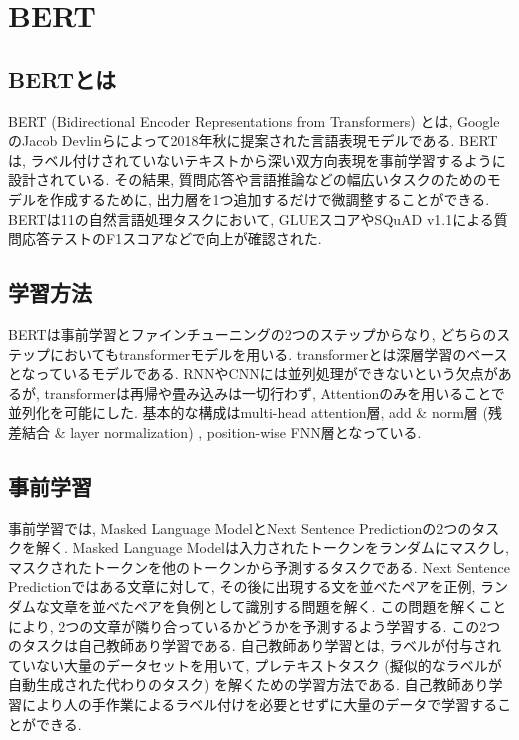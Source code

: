 
\section{BERT}
\subsection{BERTとは}\label{aboutbert}
BERT (Bidirectional Encoder Representations from Transformers) \cite{bert}とは, GoogleのJacob Devlinらによって2018年秋に提案された言語表現モデルである. BERTは, ラベル付けされていないテキストから深い双方向表現を事前学習するように設計されている. その結果, 質問応答や言語推論などの幅広いタスクのためのモデルを作成するために, 出力層を1つ追加するだけで微調整することができる. 
BERTは11の自然言語処理タスクにおいて, GLUEスコアやSQuAD v1.1による質問応答テストのF1スコアなどで向上が確認された. \cite{bert}

\subsection{学習方法}
BERTは事前学習とファインチューニングの2つのステップからなり, どちらのステップにおいてもtransformerモデルを用いる. transformerとは深層学習のベースとなっているモデルである. RNNやCNNには並列処理ができないという欠点があるが, transformerは再帰や畳み込みは一切行わず, Attentionのみを用いることで並列化を可能にした. 基本的な構成はmulti-head attention層, add \& norm層 (残差結合 \& layer normalization) , position-wise FNN層となっている. 

\subsection{事前学習}
事前学習では, Masked Language ModelとNext Sentence Predictionの2つのタスクを解く. Masked Language Modelは入力されたトークンをランダムにマスクし, マスクされたトークンを他のトークンから予測するタスクである. Next Sentence Predictionではある文章に対して, その後に出現する文を並べたペアを正例, ランダムな文章を並べたペアを負例として識別する問題を解く. この問題を解くことにより, 2つの文章が隣り合っているかどうかを予測するよう学習する. 
この2つのタスクは自己教師あり学習である. 自己教師あり学習とは, ラベルが付与されていない大量のデータセットを用いて, プレテキストタスク (擬似的なラベルが自動生成された代わりのタスク) を解くための学習方法である. 自己教師あり学習により人の手作業によるラベル付けを必要とせずに大量のデータで学習することができる. 

